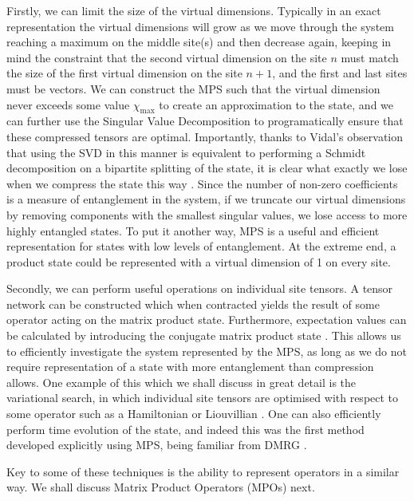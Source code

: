  Firstly, we can limit the size of the virtual dimensions. Typically in an exact representation the virtual dimensions will grow as we move through the system reaching a maximum on the middle site(s) and then decrease again, keeping in mind the constraint that the second virtual dimension on the site \(n\) must match the size of the first virtual dimension on the site \(n+1\), and the first and last sites must be vectors. We can construct the MPS such that the virtual dimension never exceeds some value \(\chi_{\mathrm{max}}\) to create an approximation to the state, and we can further use the Singular Value Decomposition to programatically ensure that these compressed tensors are optimal. Importantly, thanks to Vidal's observation that using the SVD in this manner is equivalent to performing a Schmidt decomposition on a bipartite splitting of the state, it is clear what exactly we lose when we compress the state this way \cite{Vidal2003}. Since the number of non-zero coefficients is a measure of entanglement in the system, if we truncate our virtual dimensions by removing components with the smallest singular values, we lose access to more highly entangled states. To put it another way, MPS is a useful and efficient representation for states with low levels of entanglement. At the extreme end, a product state could be represented with a virtual dimension of 1 on every site.

 Secondly, we can perform useful operations on individual site tensors. A tensor network can be constructed which when contracted yields the result of some operator acting on the matrix product state. Furthermore, expectation values can be calculated by introducing the conjugate matrix product state \cite{Schollwock2011,Orus2014}. This allows us to efficiently investigate the system represented by the MPS, as long as we do not require representation of a state with more entanglement than compression allows. One example of this which we shall discuss in great detail is the variational search, in which individual site tensors are optimised with respect to some operator such as a Hamiltonian or Liouvillian \cite{Verstraete2004,Cui2015}. One can also efficiently perform time evolution of the state, and indeed this was the first method developed explicitly using MPS, being familiar from DMRG \cite{Vidal2004}.

 Key to some of these techniques is the ability to represent operators in a similar way. We shall discuss Matrix Product Operators (MPOs) next.

